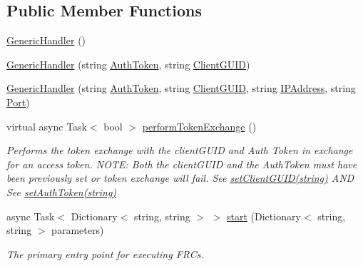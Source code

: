 \subsection*{Public Member Functions}
\begin{DoxyCompactItemize}
\item 
\mbox{\hyperlink{class_form_sim_1_1_generic_handler_a49bc6036b85224e56603c6d9401456ef}{Generic\+Handler}} ()
\item 
\mbox{\hyperlink{class_form_sim_1_1_generic_handler_aa4beee84a911e42906528ea1d1ad6193}{Generic\+Handler}} (string \mbox{\hyperlink{class_form_sim_1_1_generic_handler_a6699d8bfc9cd305baf30ab9413b21605}{Auth\+Token}}, string \mbox{\hyperlink{class_form_sim_1_1_generic_handler_ae1d2175b140f4c600d74bbab1e22714e}{Client\+G\+U\+ID}})
\item 
\mbox{\hyperlink{class_form_sim_1_1_generic_handler_a39722a58046cfc8b36e3fde80ccc69f1}{Generic\+Handler}} (string \mbox{\hyperlink{class_form_sim_1_1_generic_handler_a6699d8bfc9cd305baf30ab9413b21605}{Auth\+Token}}, string \mbox{\hyperlink{class_form_sim_1_1_generic_handler_ae1d2175b140f4c600d74bbab1e22714e}{Client\+G\+U\+ID}}, string \mbox{\hyperlink{class_form_sim_1_1_generic_handler_a12b51dea082a4d40d86829802adf073b}{I\+P\+Address}}, string \mbox{\hyperlink{class_form_sim_1_1_generic_handler_ac6492bb3e4fbe8f66c97b00bd27020c1}{Port}})
\item 
virtual async Task$<$ bool $>$ \mbox{\hyperlink{class_form_sim_1_1_generic_handler_a731bd7dada7e2d13fd9c9d768bd387ee}{perform\+Token\+Exchange}} ()
\begin{DoxyCompactList}\small\item\em Performs the token exchange with the client\+G\+U\+ID and Auth Token in exchange for an access token. N\+O\+TE\+: Both the client\+G\+U\+ID and the Auth\+Token must have been previously set or token exchange will fail. See \mbox{\hyperlink{class_form_sim_1_1_generic_handler_a3c934d9ba3f0efaadac331502ce0189c}{set\+Client\+G\+U\+I\+D(string)}} A\+ND See \mbox{\hyperlink{class_form_sim_1_1_generic_handler_a905d080f02134e993d7afbb1dcc8f44b}{set\+Auth\+Token(string)}} \end{DoxyCompactList}\item 
async Task$<$ Dictionary$<$ string, string $>$ $>$ \mbox{\hyperlink{class_form_sim_1_1_generic_handler_affac9485687a2be1595405d657922532}{start}} (Dictionary$<$ string, string $>$ parameters)
\begin{DoxyCompactList}\small\item\em The primary entry point for executing F\+R\+Cs. \end{DoxyCompactList}\item 

\end{DoxyCompactItemize}
